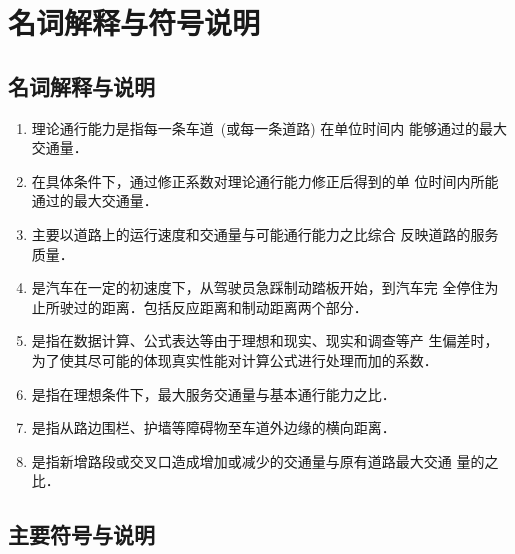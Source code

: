 \section{名词解释与符号说明}

\subsection{名词解释与说明}
\begin{enumerate}
\item {}理论通行能力是指每一条车道~(或每一条道路) 在单位时间内
能够通过的最大交通量．
\item {}在具体条件下，通过修正系数对理论通行能力修正后得到的单
位时间内所能通过的最大交通量．
\item {} 主要以道路上的运行速度和交通量与可能通行能力之比综合
反映道路的服务质量．
\item {}是汽车在一定的初速度下，从驾驶员急踩制动踏板开始，到汽车完
全停住为止所驶过的距离．包括反应距离和制动距离两个部分．
\item {}是指在数据计算、公式表达等由于理想和现实、现实和调查等产
生偏差时，为了使其尽可能的体现真实性能对计算公式进行处理而加的系数．
\item {}是指在理想条件下，最大服务交通量与基本通行能力之比．
\item {}是指从路边围栏、护墙等障碍物至车道外边缘的横向距离．
\item {}是指新增路段或交叉口造成增加或减少的交通量与原有道路最大交通
量的之比．
\end{enumerate}
\subsection{主要符号与说明}

